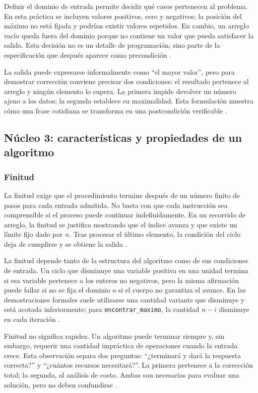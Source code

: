 \documentclass[12pt,letterpaper]{article}
\newcommand{\codigo}[1]{\texttt{#1}}
\begin{document}
Definir el dominio de entrada permite decidir qué casos pertenecen al problema. En esta práctica se incluyen valores positivos, cero y negativos; la posición del máximo no está fijada y podrían existir valores repetidos. En cambio, un arreglo vacío queda fuera del dominio porque no contiene un valor que pueda satisfacer la salida. Esta decisión no es un detalle de programación, sino parte de la especificación que después aparece como precondición \citep{hoare1969,apt2009,cormen2022}.

La salida puede expresarse informalmente como ``el mayor valor'', pero para demostrar corrección conviene precisar dos condiciones: el resultado pertenece al arreglo y ningún elemento lo supera. La primera impide devolver un número ajeno a los datos; la segunda establece su maximalidad. Esta formulación muestra cómo una frase cotidiana se transforma en una postcondición verificable \citep{hoare1969,apt2009,dijkstra1975}.

\subsection{Núcleo 3: características y propiedades de un algoritmo}

\subsubsection{Finitud}

La finitud exige que el procedimiento termine después de un número finito de pasos para cada entrada admitida. No basta con que cada instrucción sea comprensible si el proceso puede continuar indefinidamente. En un recorrido de arreglo, la finitud se justifica mostrando que el índice avanza y que existe un límite fijo dado por $n$. Tras procesar el último elemento, la condición del ciclo deja de cumplirse y se obtiene la salida \citep{zanabria2026,cormen2022,hoare1969}.

La finitud depende tanto de la estructura del algoritmo como de sus condiciones de entrada. Un ciclo que disminuye una variable positiva en una unidad termina si esa variable pertenece a los enteros no negativos, pero la misma afirmación puede fallar si no se fija el dominio o si el cuerpo no garantiza el avance. En las demostraciones formales suele utilizarse una cantidad variante que disminuye y está acotada inferiormente; para \codigo{encontrar\_maximo}, la cantidad $n-i$ disminuye en cada iteración \citep{hoare1969,dijkstra1975,cormen2022}.

Finitud no significa rapidez. Un algoritmo puede terminar siempre y, sin embargo, requerir una cantidad impráctica de operaciones cuando la entrada crece. Esta observación separa dos preguntas: ``¿terminará y dará la respuesta correcta?'' y ``¿cuántos recursos necesitará?''. La primera pertenece a la corrección total; la segunda, al análisis de costo. Ambas son necesarias para evaluar una solución, pero no deben confundirse \citep{cormen2022,skiena2020,sedgewick2011}.
\end{document}

